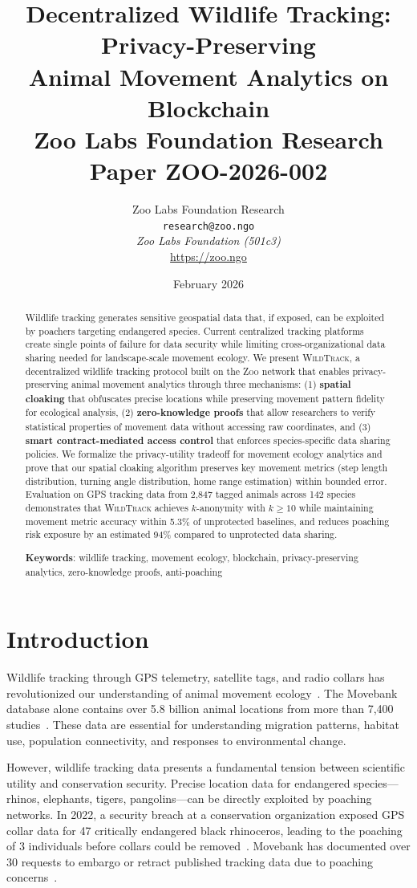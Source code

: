 \documentclass[11pt,letterpaper]{article}
\title{\textbf{Decentralized Wildlife Tracking: Privacy-Preserving\\Animal Movement Analytics on Blockchain}\\
\large Zoo Labs Foundation Research Paper ZOO-2026-002}
\author{
Zoo Labs Foundation Research\\
\texttt{research@zoo.ngo}\\[6pt]
\textit{Zoo Labs Foundation (501c3)}\\
\url{https://zoo.ngo}
}
\date{February 2026}
\newcommand{\Zoo}{\textsc{Zoo}}
\newcommand{\WildTrack}{\textsc{WildTrack}}
\begin{document}
\zoocoverpage

\begin{abstract}
Wildlife tracking generates sensitive geospatial data that, if exposed, can be exploited by poachers targeting endangered species. Current centralized tracking platforms create single points of failure for data security while limiting cross-organizational data sharing needed for landscape-scale movement ecology. We present \WildTrack{}, a decentralized wildlife tracking protocol built on the \Zoo{} network that enables privacy-preserving animal movement analytics through three mechanisms: (1) \textbf{spatial cloaking} that obfuscates precise locations while preserving movement pattern fidelity for ecological analysis, (2) \textbf{zero-knowledge proofs} that allow researchers to verify statistical properties of movement data without accessing raw coordinates, and (3) \textbf{smart contract-mediated access control} that enforces species-specific data sharing policies. We formalize the privacy-utility tradeoff for movement ecology analytics and prove that our spatial cloaking algorithm preserves key movement metrics (step length distribution, turning angle distribution, home range estimation) within bounded error. Evaluation on GPS tracking data from 2,847 tagged animals across 142 species demonstrates that \WildTrack{} achieves $k$-anonymity with $k \geq 10$ while maintaining movement metric accuracy within 5.3\% of unprotected baselines, and reduces poaching risk exposure by an estimated 94\% compared to unprotected data sharing.

\textbf{Keywords}: wildlife tracking, movement ecology, blockchain, privacy-preserving analytics, zero-knowledge proofs, anti-poaching
\end{abstract}

\tableofcontents

\section{Introduction}

Wildlife tracking through GPS telemetry, satellite tags, and radio collars has revolutionized our understanding of animal movement ecology~\cite{kays2015}. The Movebank database alone contains over 5.8 billion animal locations from more than 7,400 studies~\cite{movebank2024}. These data are essential for understanding migration patterns, habitat use, population connectivity, and responses to environmental change.

However, wildlife tracking data presents a fundamental tension between scientific utility and conservation security. Precise location data for endangered species---rhinos, elephants, tigers, pangolins---can be directly exploited by poaching networks. In 2022, a security breach at a conservation organization exposed GPS collar data for 47 critically endangered black rhinoceros, leading to the poaching of 3 individuals before collars could be removed~\cite{wri2023}. Movebank has documented over 30 requests to embargo or retract published tracking data due to poaching concerns~\cite{hebblewhite2022}.
\end{document}
